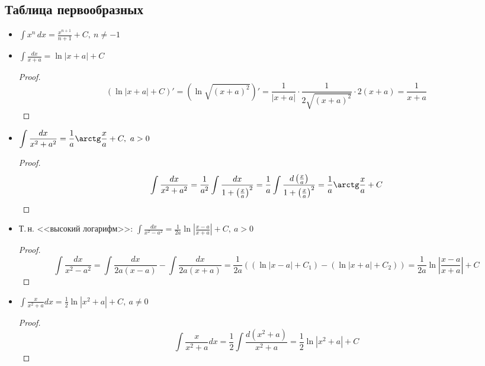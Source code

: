 \subsection{Таблица первообразных}
\begin{itemize}
	\item $\displaystyle \int x^n\,dx = \frac{x^{n+1}}{n + 1} + C, \ n \neq -1$
	
	\item $\displaystyle \int \frac{dx}{x + a} = \ln |x + a| + C$
	\begin{proof}
	\begin{equation*}
	(\ln |x + a| + C)' = (\ln \sqrt{(x + a)^2})' = \frac1{|x + a|} \cdot \frac1{2\sqrt{(x + a)^2}} \cdot 2(x + a) = \frac1{x + a}
	\end{equation*}
	\end{proof}
	
	\item $\displaystyle \int \frac{dx}{x^2 + a^2} = \frac1a \arctg \frac{x}a + C, \ a > 0$
	\begin{proof}
	\begin{equation*}
	\int \frac{dx}{x^2 + a^2} =
	\frac1{a^2} \int \frac{dx}{1 + \left( \frac{x}a \right)^2} =
	\frac1a \int \frac{d \left( \frac{x}a \right)}{1 + \left( \frac{x}a \right)^2} =
	\frac1a \arctg \frac{x}a + C
	\end{equation*}
	\end{proof}
	
	\item Т.\,н. <<высокий логарифм>>: $\displaystyle \int \frac{dx}{x^2 - a^2} = \frac1{2a} \ln \left| \frac{x - a}{x + a} \right| + C, \ a > 0$
	\begin{proof}
	\begin{equation*}
	\int \frac{dx}{x^2 - a^2} =
	\int \frac{dx}{2a(x - a)} - \int \frac{dx}{2a(x + a)} =
	\frac1{2a} ((\ln |x - a| + C_1) - (\ln |x + a| + C_2)) =
	\frac1{2a} \ln \left| \frac{x - a}{x + a} \right| + C
	\end{equation*}
	\end{proof}
	
	\item $\displaystyle \int \frac{x}{x^2 + a} dx = \frac12 \ln |x^2 + a| + C, \ a \neq 0$
	\begin{proof}
	\begin{equation*}
	\int \frac{x}{x^2 + a} dx =
	\frac12 \int \frac{d(x^2 + a)}{x^2 + a} =
	\frac12 \ln |x^2 + a| + C
	\end{equation*}
	\end{proof}
	

\end{itemize}
